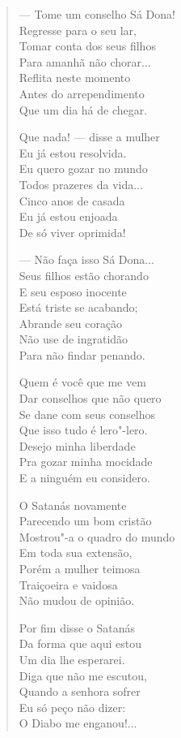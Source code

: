 \begin{verse}
---  Tome um conselho Sá Dona! \\
Regresse para o seu lar, \\
Tomar conta dos seus filhos \\
Para amanhã não chorar... \\
Reflita neste momento \\
Antes do arrependimento \\
Que um dia há de chegar. 

Que nada! ---  disse a mulher \\
Eu já estou resolvida. \\
Eu quero gozar no mundo \\
Todos prazeres da vida... \\
Cinco anos de casada \\
Eu já estou enjoada \\
De só viver oprimida! 

---  Não faça isso Sá Dona... \\
Seus filhos estão chorando \\
E seu esposo inocente \\
Está triste se acabando; \\
Abrande seu coração \\
Não use de ingratidão \\
Para não findar penando. 


Quem é você que me vem \\
Dar conselhos que não quero \\
Se dane com seus conselhos \\
Que isso tudo é lero"-lero. \\
Desejo minha liberdade \\
Pra gozar minha mocidade \\
E a ninguém eu considero. 

O Satanás novamente \\
Parecendo um bom cristão \\
Mostrou"-a o quadro do mundo \\
Em toda sua extensão, \\
Porém a mulher teimosa \\
Traiçoeira e vaidosa \\
Não mudou de opinião. 

Por fim disse o Satanás \\
Da forma que aqui estou \\
Um dia lhe esperarei. \\
Diga que não me escutou, \\
Quando a senhora sofrer \\
Eu só peço não dizer: \\
O Diabo me enganou!... 


\end{verse}
